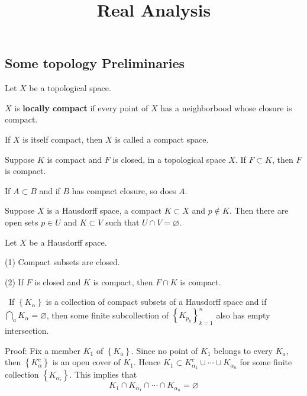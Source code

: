 \documentclass[12pt, a4paper, oneside]{book}
\begin{document}
\frontmatter
\title{{\Huge{\textbf{Real Analysis}}}}
\maketitle
{}
\tableofcontents %


\mainmatter

\chapter{}

\section{Some topology Preliminaries}
\begin{definition}
    Let $X$ be a topological space.

    $X$ is \textbf{locally compact} if every point of $X$ has a neighborbood whose closure is compact.

    If $X$ is itself compact, then $X$ is called a compact space.
\end{definition}
\begin{theorem}
    Suppose $K$ is compact and $F$ is closed, in a topological space $X$. If $F \subset K$, then $F$ is compact.
\end{theorem}
\begin{corollary}
    If $A \subset B$ and if $B$ has compact closure, so does $A$.
\end{corollary}
\begin{theorem}
    Suppose $X$ is a Hausdorff space, a compact $K\subset X$ and $p \notin K$. Then there are open sets $p \in U$ and $K\subset V$ such that $U \cap V=\varnothing$.
\end{theorem}
\begin{corollary}
    Let $X$ be a Hausdorff space.

    (1) Compact subsets are closed.

    (2) If $F$ is closed and $K$ is compact, then $F \cap K$ is compact.
\end{corollary}
\begin{theorem}\
    If $\left\{K_\alpha\right\}$ is a collection of compact subsets of a Hausdorff space and if $\bigcap_a K_\alpha=\varnothing$, then some finite subcollection of $\left\{K_{p_k}\right\}_{k=1}^n$ also has empty intersection.

    Proof:
    Fix a member $K_1$ of $\left\{K_a\right\}$. Since no point of $K_1$ belongs to every $K_a$, then $\left\{K_\alpha^c\right\}$ is an open cover of $K_1$. Hence $K_1 \subset K_{\alpha_1}^c \cup \cdots \cup K_{\alpha_{n}}$ for some finite collection $\left\{K_{\alpha_i}\right\}$. This implies that
    $$
        K_1 \cap K_{\alpha_1} \cap \cdots \cap K_{\alpha_n}=\varnothing
    $$
\end{theorem}
\end{document}
